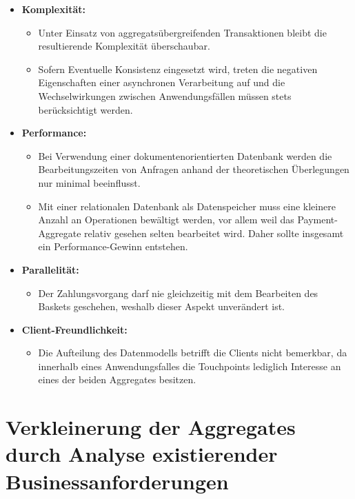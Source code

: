 \begin{itemize}[noitemsep,nolistsep,topsep=-2pt]
	\item \textbf{Komplexität: } {
		\begin{itemize}
			\item {Unter Einsatz von aggregatsübergreifenden Transaktionen bleibt die resultierende Komplexität überschaubar.}
			\item {Sofern Eventuelle Konsistenz eingesetzt wird, treten die negativen Eigenschaften einer asynchronen Verarbeitung auf und die Wechselwirkungen zwischen Anwendungsfällen müssen stets berücksichtigt werden.}
		\end{itemize}
	}
	\item \textbf{Performance: } {
		\begin{itemize}
			\item Bei Verwendung einer dokumentenorientierten Datenbank werden die Bearbeitungszeiten von Anfragen anhand der theoretischen Überlegungen nur minimal beeinflusst.
			\item Mit einer relationalen Datenbank als Datenspeicher muss eine kleinere Anzahl an Operationen bewältigt werden, vor allem weil das Payment-Aggregate relativ gesehen selten bearbeitet wird. Daher sollte insgesamt ein Performance-Gewinn entstehen. 
		\end{itemize}
	}
	\item \textbf{Parallelität: } {
		\begin{itemize}
			\item Der Zahlungsvorgang darf nie gleichzeitig mit dem Bearbeiten des Baskets geschehen, weshalb dieser Aspekt unverändert ist. 
		\end{itemize}	
	}
	\item \textbf{Client-Freundlichkeit: } {
		\begin{itemize}
			\item Die Aufteilung des Datenmodells betrifft die Clients nicht bemerkbar, da innerhalb eines Anwendungsfalles die Touchpoints lediglich Interesse an eines der beiden Aggregates besitzen.
		\end{itemize}
	}
\end{itemize}

\pagebreak

\section{Verkleinerung der Aggregates durch Analyse existierender Businessanforderungen}

